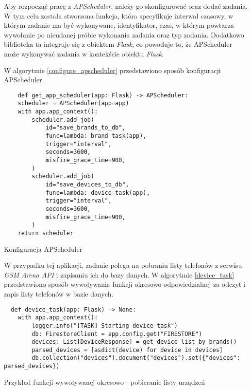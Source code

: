 Aby rozpocząć pracę z \textit{APScheduler}, należy go skonfigurować oraz dodać zadania. W tym celu została stworzona funkcja, która specyfikuje interwał czasowy, w którym zadanie ma być wykonywane, identyfikator, czas, w którym powtarza wywołanie po nieudanej próbie wykonania zadania oraz typ zadania. Dodatkowo biblioteka ta integruje się z obiektem \textit{Flask}, co powoduje to, że APScheduler może wykonywać zadania w kontekście obiektu \textit{Flask}.

W algorytmie \ref{configure_apscheduler} przedstawiono sposób konfiguracji APScheduler.

\begin{code}[H]
  \begin{verbatim}
    def get_app_scheduler(app: Flask) -> APScheduler:
    scheduler = APScheduler(app=app)
    with app.app_context():
        scheduler.add_job(
            id="save_brands_to_db",
            func=lambda: brand_task(app),
            trigger="interval",
            seconds=3600,
            misfire_grace_time=900,
        )
        scheduler.add_job(
            id="save_devices_to_db",
            func=lambda: device_task(app),
            trigger="interval",
            seconds=3600,
            misfire_grace_time=900,
        )
    return scheduler
  \end{verbatim}
  \caption{Konfiguracja APScheduler}
  \label{configure_apscheduler}
\end{code}

W przypadku tej aplikacji, zadanie polega na pobraniu listy telefonów z serwisu \textit{GSM Arena API} i zapisaniu ich do bazy danych. W algorytmie \ref{device_task} przedstawiono sposób wywoływania funkcji okresowo odpowiedzialnej za odczyt i zapis listy telefonów w bazie danych.

\begin{code}[H]
  \begin{verbatim}
  def device_task(app: Flask) -> None:
    with app.app_context():
        logger.info("[TASK] Starting device task")
        db: FirestoreClient = app.config.get("FIRESTORE")
        devices: List[DeviceResponse] = get_device_list_by_brands()
        parsed_devices = [asdict(device) for device in devices]
        db.collection("devices").document("devices").set({"devices": parsed_devices})
  \end{verbatim}
  \caption{Przykład funkcji wywoływanej okresowo - pobieranie listy urządzeń}
  \label{device_task}
\end{code}

